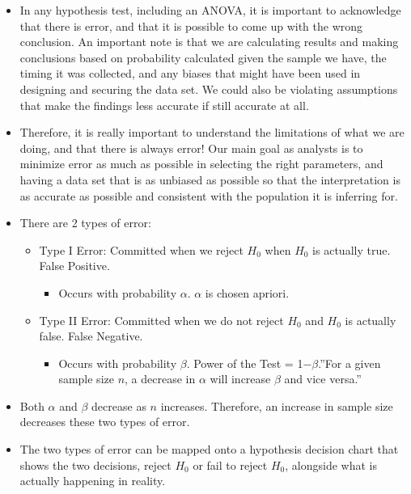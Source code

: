 \documentclass[
  letterpaper,
  DIV=11,
  numbers=noendperiod]{scrreprt}
\providecommand{\tightlist}{%
  \setlength{\itemsep}{0pt}\setlength{\parskip}{0pt}}\usepackage{longtable,booktabs,array}
\begin{document}
\begin{itemize}
\item
  In any hypothesis test, including an ANOVA, it is important to
  acknowledge that there is error, and that it is possible to come up
  with the wrong conclusion. An important note is that we are
  calculating results and making conclusions based on probability
  calculated given the sample we have, the timing it was collected, and
  any biases that might have been used in designing and securing the
  data set. We could also be violating assumptions that make the
  findings less accurate if still accurate at all.\\
\item
  Therefore, it is really important to understand the limitations of
  what we are doing, and that there is always error! Our main goal as
  analysts is to minimize error as much as possible in selecting the
  right parameters, and having a data set that is as unbiased as
  possible so that the interpretation is as accurate as possible and
  consistent with the population it is inferring for.
\item
  There are 2 types of error:

  \begin{itemize}
  \tightlist
  \item
    Type I Error: Committed when we reject \(H_0\) when \(H_0\) is
    actually true. False Positive.

    \begin{itemize}
    \tightlist
    \item
      Occurs with probability \(\alpha\). \(\alpha\) is chosen apriori.
    \end{itemize}
  \item
    Type II Error: Committed when we do not reject \(H_0\) and \(H_0\)
    is actually false. False Negative.

    \begin{itemize}
    \tightlist
    \item
      Occurs with probability \(\beta\). Power of the Test =
      1−\(\beta\).''For a given sample size \(n\), a decrease in
      \(\alpha\) will increase \(\beta\) and vice versa.''
    \end{itemize}
  \end{itemize}
\item
  Both \(\alpha\) and \(\beta\) decrease as \(n\) increases. Therefore,
  an increase in sample size decreases these two types of error.
\item
  The two types of error can be mapped onto a hypothesis decision chart
  that shows the two decisions, reject \(H_0\) or fail to reject
  \(H_0\), alongside what is actually happening in reality.
\end{itemize}
\end{document}
